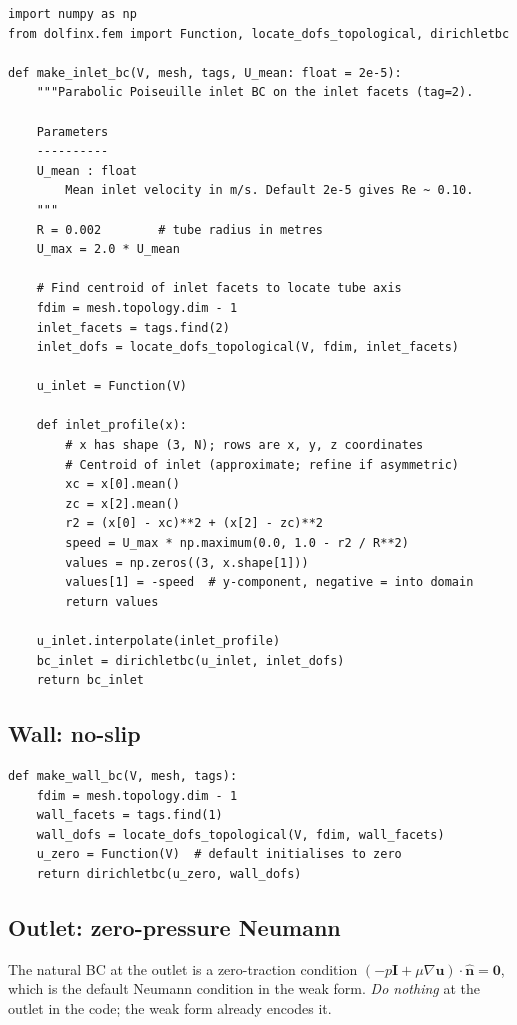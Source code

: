 \documentclass[11pt]{article}
\begin{document}
\begin{lstlisting}
import numpy as np
from dolfinx.fem import Function, locate_dofs_topological, dirichletbc

def make_inlet_bc(V, mesh, tags, U_mean: float = 2e-5):
    """Parabolic Poiseuille inlet BC on the inlet facets (tag=2).

    Parameters
    ----------
    U_mean : float
        Mean inlet velocity in m/s. Default 2e-5 gives Re ~ 0.10.
    """
    R = 0.002        # tube radius in metres
    U_max = 2.0 * U_mean

    # Find centroid of inlet facets to locate tube axis
    fdim = mesh.topology.dim - 1
    inlet_facets = tags.find(2)
    inlet_dofs = locate_dofs_topological(V, fdim, inlet_facets)

    u_inlet = Function(V)

    def inlet_profile(x):
        # x has shape (3, N); rows are x, y, z coordinates
        # Centroid of inlet (approximate; refine if asymmetric)
        xc = x[0].mean()
        zc = x[2].mean()
        r2 = (x[0] - xc)**2 + (x[2] - zc)**2
        speed = U_max * np.maximum(0.0, 1.0 - r2 / R**2)
        values = np.zeros((3, x.shape[1]))
        values[1] = -speed  # y-component, negative = into domain
        return values

    u_inlet.interpolate(inlet_profile)
    bc_inlet = dirichletbc(u_inlet, inlet_dofs)
    return bc_inlet
\end{lstlisting}

\subsection*{Wall: no-slip}

\begin{lstlisting}
def make_wall_bc(V, mesh, tags):
    fdim = mesh.topology.dim - 1
    wall_facets = tags.find(1)
    wall_dofs = locate_dofs_topological(V, fdim, wall_facets)
    u_zero = Function(V)  # default initialises to zero
    return dirichletbc(u_zero, wall_dofs)
\end{lstlisting}

\subsection*{Outlet: zero-pressure Neumann}

The natural BC at the outlet is a zero-traction condition
$(-p\mathbf{I} + \mu\nabla\mathbf{u})\cdot\hat{\mathbf{n}} = \mathbf{0}$,
which is the default Neumann condition in the weak form. \emph{Do nothing}
at the outlet in the code; the weak form already encodes it.
\end{document}
